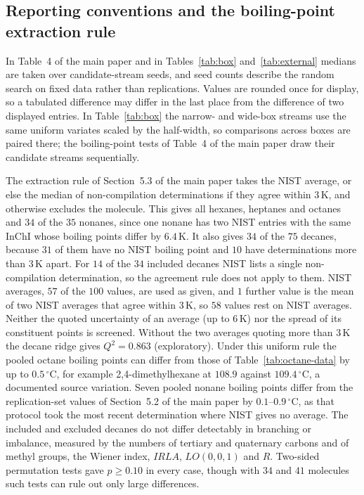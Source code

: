 \documentclass[a5paper, 10pt]{article}
\theoremstyle{plain}
\theoremstyle{remark}
\theoremstyle{definition}
\begin{document}
\subsection*{Reporting conventions and the boiling-point extraction rule}
In Table~4 of the main paper and in Tables~\ref{tab:box} and~\ref{tab:external} medians are taken over candidate-stream seeds, and seed counts describe the random search on fixed data rather than replications. Values are rounded once for display, so a tabulated difference may differ in the last place from the difference of two displayed entries. In Table~\ref{tab:box} the narrow- and wide-box streams use the same uniform variates scaled by the half-width, so comparisons across boxes are paired there; the boiling-point tests of Table~4 of the main paper draw their candidate streams sequentially.

The extraction rule of Section~5.3 of the main paper takes the NIST
average, or else the median of non-compilation determinations if they
agree within $3$\,K, and otherwise excludes the molecule. This gives all
hexanes, heptanes and octanes and $34$ of the $35$ nonanes, since one
nonane has two NIST entries with the same InChI whose boiling points
differ by $6.4$\,K. It also gives $34$ of the $75$ decanes, because
$31$ of them have no NIST boiling point and $10$ have determinations
more than $3$\,K apart. For $14$ of the $34$ included decanes NIST lists
a single non-compilation determination, so the agreement rule does not
apply to them. NIST averages, $57$ of the $100$ values, are used as given, and $1$ further value is the mean of two NIST averages that agree within $3$\,K, so $58$ values rest on NIST averages. Neither the quoted uncertainty of an average (up to $6$\,K) nor the spread of its constituent points is screened. Without the two averages quoting more than $3$\,K the decane ridge gives $Q^2 = 0.863$ (exploratory). Under this uniform rule the pooled octane boiling points
can differ from those of Table~\ref{tab:octane-data} by up to
$0.5\,^{\circ}$C, for example 2,4-dimethylhexane at $108.9$ against
$109.4\,^{\circ}$C, a documented source variation. Seven pooled nonane boiling points differ from the replication-set values of
Section~5.2 of the main paper by $0.1$--$0.9\,^{\circ}$C, as that protocol
took the most recent determination where NIST gives no average. The
included and excluded decanes do not differ detectably in branching or
imbalance, measured by the numbers of tertiary and quaternary carbons
and of methyl groups, the Wiener index, $IRLA$, $LO(0,0,1)$ and $R$.
Two-sided permutation tests gave $p \ge 0.10$ in every case, though
with $34$ and $41$ molecules such tests can rule out only large
differences.
\end{document}
